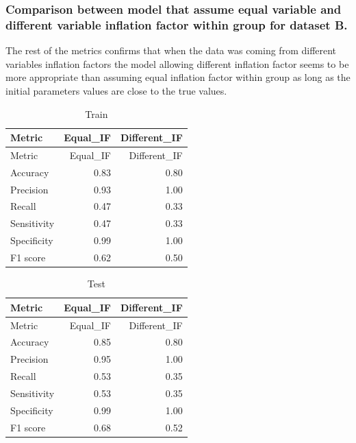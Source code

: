 \documentclass[
]{article}
\begin{document}
\hypertarget{comparison-between-model-that-assume-equal-variable-and-different-variable-inflation-factor-within-group-for-dataset-b.}{%
\subsubsection{Comparison between model that assume equal variable and
different variable inflation factor within group for dataset
B.}\label{comparison-between-model-that-assume-equal-variable-and-different-variable-inflation-factor-within-group-for-dataset-b.}}

The rest of the metrics confirms that when the data was coming from
different variables inflation factors the model allowing different
inflation factor seems to be more appropriate than assuming equal
inflation factor within group as long as the initial parameters values
are close to the true values.

\begin{longtable}[]{@{}lrr@{}}
\caption{Train}\tabularnewline
\toprule\noalign{}
Metric & Equal\_IF & Different\_IF \\
\midrule\noalign{}
\endfirsthead
\toprule\noalign{}
Metric & Equal\_IF & Different\_IF \\
\midrule\noalign{}
\endhead
\bottomrule\noalign{}
\endlastfoot
Accuracy & 0.83 & 0.80 \\
Precision & 0.93 & 1.00 \\
Recall & 0.47 & 0.33 \\
Sensitivity & 0.47 & 0.33 \\
Specificity & 0.99 & 1.00 \\
F1 score & 0.62 & 0.50 \\
\end{longtable}

\begin{longtable}[]{@{}lrr@{}}
\caption{Test}\tabularnewline
\toprule\noalign{}
Metric & Equal\_IF & Different\_IF \\
\midrule\noalign{}
\endfirsthead
\toprule\noalign{}
Metric & Equal\_IF & Different\_IF \\
\midrule\noalign{}
\endhead
\bottomrule\noalign{}
\endlastfoot
Accuracy & 0.85 & 0.80 \\
Precision & 0.95 & 1.00 \\
Recall & 0.53 & 0.35 \\
Sensitivity & 0.53 & 0.35 \\
Specificity & 0.99 & 1.00 \\
F1 score & 0.68 & 0.52 \\
\end{longtable}
\end{document}
